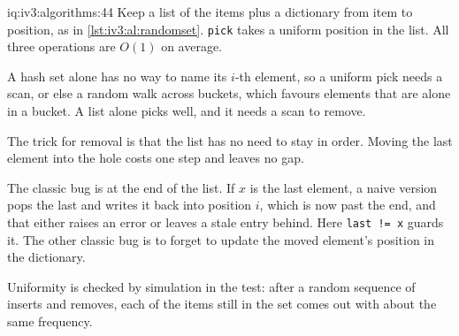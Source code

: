 \begin{solution}{iq:iv3:algorithms:44}
Keep a list of the items plus a dictionary from item to position, as in \cref{lst:iv3:al:randomset}. \texttt{pick} takes a uniform position in the list. All three operations are $O(1)$ on average.
\label{lst:iv3:al:randomset}

A hash set alone has no way to name its $i$-th element, so a uniform pick needs a scan, or else a random walk across buckets, which favours elements that are alone in a bucket. A list alone picks well, and it needs a scan to remove.

The trick for removal is that the list has no need to stay in order. Moving the last element into the hole costs one step and leaves no gap.

The classic bug is at the end of the list. If $x$ is the last element, a naive version pops the last and writes it back into position $i$, which is now past the end, and that either raises an error or leaves a stale entry behind. Here \texttt{last != x} guards it. The other classic bug is to forget to update the moved element's position in the dictionary.

Uniformity is checked by simulation in the test: after a random sequence of inserts and removes, each of the items still in the set comes out with about the same frequency.

\end{solution}

